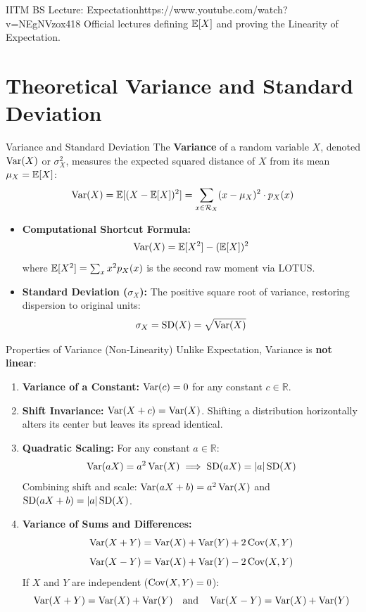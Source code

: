 \begin{videocard}{IITM BS Lecture: Expectation}{https://www.youtube.com/watch?v=NEgNVzox418}
Official lectures defining $\mathbb{E}[X]$ and proving the Linearity of Expectation.
\end{videocard}

\section{Theoretical Variance and Standard Deviation}

\begin{definitionbox}{Variance and Standard Deviation}
The \textbf{Variance} of a random variable $X$, denoted $\operatorname{Var}(X)$ or $\sigma_X^2$, measures the expected squared distance of $X$ from its mean $\mu_X = \mathbb{E}[X]$:
$$\operatorname{Var}(X) = \mathbb{E}[(X - \mathbb{E}[X])^2] = \sum_{x \in \mathcal{R}_X} (x - \mu_X)^2 \cdot p_X(x)$$
\begin{itemize}
    \item \textbf{Computational Shortcut Formula:}
    $$\operatorname{Var}(X) = \mathbb{E}[X^2] - (\mathbb{E}[X])^2$$
    where $\mathbb{E}[X^2] = \sum_{x} x^2 p_X(x)$ is the second raw moment via LOTUS.
    \item \textbf{Standard Deviation ($\sigma_X$):} The positive square root of variance, restoring dispersion to original units:
    $$\sigma_X = \operatorname{SD}(X) = \sqrt{\operatorname{Var}(X)}$$
\end{itemize}
\end{definitionbox}

\begin{theorembox}{Properties of Variance (Non-Linearity)}
Unlike Expectation, Variance is \textbf{not linear}:
\begin{enumerate}
    \item \textbf{Variance of a Constant:} $\operatorname{Var}(c) = 0$ for any constant $c \in \mathbb{R}$.
    \item \textbf{Shift Invariance:} $\operatorname{Var}(X + c) = \operatorname{Var}(X)$. Shifting a distribution horizontally alters its center but leaves its spread identical.
    \item \textbf{Quadratic Scaling:} For any constant $a \in \mathbb{R}$:
    $$\operatorname{Var}(aX) = a^2 \operatorname{Var}(X) \implies \operatorname{SD}(aX) = |a|\operatorname{SD}(X)$$
    Combining shift and scale: $\operatorname{Var}(aX + b) = a^2\operatorname{Var}(X)$ and $\operatorname{SD}(aX + b) = |a|\operatorname{SD}(X)$.
    \item \textbf{Variance of Sums and Differences:}
    $$\operatorname{Var}(X + Y) = \operatorname{Var}(X) + \operatorname{Var}(Y) + 2\operatorname{Cov}(X, Y)$$
    $$\operatorname{Var}(X - Y) = \operatorname{Var}(X) + \operatorname{Var}(Y) - 2\operatorname{Cov}(X, Y)$$
    If $X$ and $Y$ are independent ($\operatorname{Cov}(X, Y) = 0$):
    $$\operatorname{Var}(X + Y) = \operatorname{Var}(X) + \operatorname{Var}(Y) \quad \text{and} \quad \operatorname{Var}(X - Y) = \operatorname{Var}(X) + \operatorname{Var}(Y)$$
\end{enumerate}
\end{theorembox}

